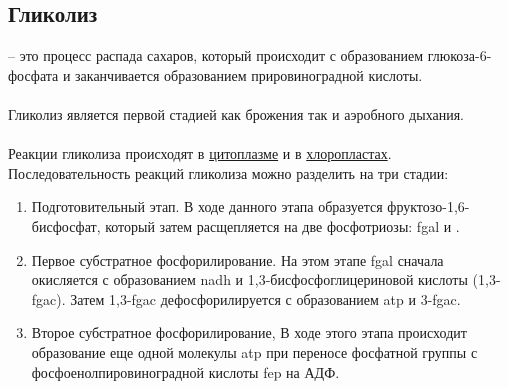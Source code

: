 
\subsection*{Гликолиз}


 -- это процесс распада сахаров, который происходит с образованием глюкоза-6-фосфата и заканчивается образованием прировиноградной кислоты.

\paragraph*{}Гликолиз является первой стадией как брожения так и аэробного дыхания.

\paragraph*{}Реакции гликолиза происходят в \hyperlink{protoplast}{цитоплазме} и в \hyperlink{plastides}{хлоропластах}. Последовательность реакций гликолиза можно разделить на три стадии:

\begin{enumerate}
	\item Подготовительный этап. В ходе данного этапа образуется фруктозо-1,6-бисфосфат, который затем расщепляется на две фосфотриозы: \gls{fgal} и .
	\item Первое \hypertarget{substratickFosforolysis}{субстратное фосфорилирование}. На этом этапе \gls{fgal} сначала окисляется с образованием \gls{nadh} и 1,3-бисфосфоглицериновой кислоты (1,3-\gls{fgac}). Затем 1,3-\gls{fgac} дефосфорилируется с образованием \gls{atp} и 3-\gls{fgac}.
	\item Второе субстратное фосфорилирование, В ходе этого этапа происходит образование еще одной молекулы \gls{atp} при переносе фосфатной группы с фосфоенолпировиноградной кислоты \gls{fep} на АДФ.

\end{enumerate}


